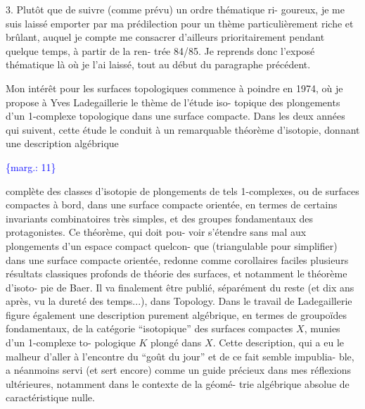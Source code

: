 \documentclass[11pt]{article}
\newcommand{\scanpage}[1]{\par\bigskip\noindent{\small\sffamily[scan #1]}\par}
\newcommand{\mspage}[1]{{\small\sffamily[p.\,#1]}}
\newcommand{\margin}[1]{\textcolor{blue}{\{\textsf{marg.:} #1\}}}
\begin{document}
3. Plutôt que de suivre (comme prévu) un ordre thématique ri-%
goureux, je me suis laissé emporter par ma prédilection pour un thème
particulièrement riche et brûlant, auquel je compte me consacrer
d'ailleurs prioritairement pendant quelque temps, à partir de la ren-%
trée 84/85. Je reprends donc l'exposé thématique là où je l'ai laissé,
tout au début du paragraphe précédent.

Mon intérêt pour les surfaces topologiques commence à poindre
en 1974, où je propose à Yves Ladegaillerie le thème de l'étude iso-%
topique des plongements d'un 1-complexe topologique dans une surface
compacte. Dans les deux années qui suivent, cette étude le conduit à
un remarquable théorème d'isotopie, donnant une description algébrique

\margin{11}

\clearpage
\scanpage{119/12}
\mspage{10}

complète des classes d'isotopie de plongements de tels 1-complexes,
ou de surfaces compactes à bord, dans une surface compacte orientée,
en termes de certains invariants combinatoires très simples, et des
groupes fondamentaux des protagonistes. Ce théorème, qui doit pou-%
voir s'étendre sans mal aux plongements d'un espace compact quelcon-%
que (triangulable pour simplifier) dans une surface compacte orientée,
redonne comme corollaires faciles plusieurs résultats classiques
profonds de théorie des surfaces, et notamment le théorème d'isoto-%
pie de Baer. Il va finalement être publié, séparément du reste (et
dix ans après, vu la dureté des temps...), dans Topology. Dans le
travail de Ladegaillerie figure également une description purement
algébrique, en termes de groupoïdes fondamentaux, de la catégorie
``isotopique'' des surfaces compactes $X$, munies d'un 1-complexe to-%
pologique $K$ plongé dans $X$. Cette description, qui a eu le malheur
d'aller à l'encontre du ``goût du jour'' et de ce fait semble impublia-%
ble, a néanmoins servi (et sert encore) comme un guide précieux dans
mes réflexions ultérieures, notamment dans le contexte de la géomé-%
trie algébrique absolue de caractéristique nulle.
\end{document}
